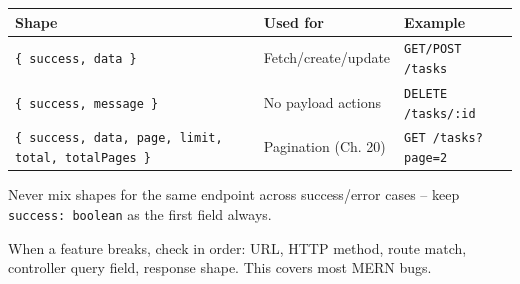 \begin{table}[h]
\centering
\begin{tabularx}{\textwidth}{lXl}
\toprule
\textbf{Shape} & \textbf{Used for} & \textbf{Example} \\
\midrule
\texttt{\{ success, data \}} & Fetch/create/update & \texttt{GET/POST /tasks} \\
\texttt{\{ success, message \}} & No payload actions & \texttt{DELETE /tasks/:id} \\
\texttt{\{ success, data, page, limit, total, totalPages \}} & Pagination (Ch. 20) & \texttt{GET /tasks?page=2} \\
\bottomrule
\end{tabularx}
\end{table}

\begin{warnbox}[WARNING]
Never mix shapes for the same endpoint across success/error cases -- keep
\texttt{success: boolean} as the first field always.
\end{warnbox}

\begin{tipbox}[TIP]
When a feature breaks, check in order: URL, HTTP method, route match,
controller query field, response shape. This covers most MERN bugs.
\end{tipbox}
